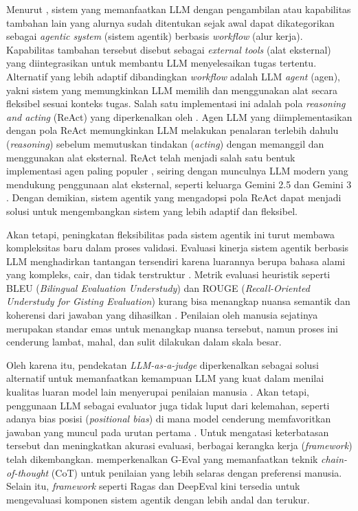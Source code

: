 Menurut \textcite{anthropicBuildingEffectiveAgents2024}, sistem yang memanfaatkan LLM dengan pengambilan atau kapabilitas tambahan lain yang alurnya sudah ditentukan sejak awal dapat dikategorikan sebagai \textit{agentic system} (sistem agentik) berbasis \textit{workflow} (alur kerja). Kapabilitas tambahan tersebut disebut sebagai \textit{external tools} (alat eksternal) yang diintegrasikan untuk membantu LLM menyelesaikan tugas tertentu. Alternatif yang lebih adaptif dibandingkan \textit{workflow} adalah LLM \textit{agent} (agen), yakni sistem yang memungkinkan LLM memilih dan menggunakan alat secara fleksibel sesuai konteks tugas. Salah satu implementasi ini adalah pola \textit{reasoning and acting} (ReAct) yang diperkenalkan oleh \textcite{yaoReActSynergizingReasoning2023}. Agen LLM yang diimplementasikan dengan pola ReAct memungkinkan LLM melakukan penalaran terlebih dahulu (\textit{reasoning}) sebelum memutuskan tindakan (\textit{acting}) dengan memanggil dan menggunakan alat eksternal. ReAct telah menjadi salah satu bentuk implementasi agen paling populer \parencite{yuSurveyAgentWorkflow2025}, seiring dengan munculnya LLM modern yang mendukung penggunaan alat eksternal, seperti keluarga Gemini 2.5 \parencite{comaniciGemini25Pushing2025} dan Gemini 3 \parencite{google2025}. Dengan demikian, sistem agentik yang mengadopsi pola ReAct dapat menjadi solusi untuk mengembangkan sistem yang lebih adaptif dan fleksibel.

Akan tetapi, peningkatan fleksibilitas pada sistem agentik ini turut membawa kompleksitas baru dalam proses validasi. Evaluasi kinerja sistem agentik berbasis LLM menghadirkan tantangan tersendiri karena luarannya berupa bahasa alami yang kompleks, cair, dan tidak terstruktur \parencite{liuGEvalNLGEvaluation2023}. Metrik evaluasi heuristik seperti BLEU (\textit{Bilingual Evaluation Understudy}) dan ROUGE (\textit{Recall-Oriented Understudy for Gisting Evaluation}) kurang bisa menangkap nuansa semantik dan koherensi dari jawaban yang dihasilkan \parencite{saiSurveyEvaluationMetrics2022}. Penilaian oleh manusia sejatinya merupakan standar emas untuk menangkap nuansa tersebut, namun proses ini cenderung lambat, mahal, dan sulit dilakukan dalam skala besar. 

Oleh karena itu, pendekatan \textit{LLM-as-a-judge} diperkenalkan sebagai solusi alternatif untuk memanfaatkan kemampuan LLM yang kuat dalam menilai kualitas luaran model lain menyerupai penilaian manusia \parencite{liGenerationJudgmentOpportunities2025}. Akan tetapi, penggunaan LLM sebagai evaluator juga tidak luput dari kelemahan, seperti adanya bias posisi (\textit{positional bias}) di mana model cenderung memfavoritkan jawaban yang muncul pada urutan pertama \parencite{wangLargeLanguageModels2024}. Untuk mengatasi keterbatasan tersebut dan meningkatkan akurasi evaluasi, berbagai kerangka kerja (\textit{framework}) telah dikembangkan. \textcite{liuGEvalNLGEvaluation2023} memperkenalkan G-Eval yang memanfaatkan teknik \textit{chain-of-thought} (CoT) untuk penilaian yang lebih selaras dengan preferensi manusia. Selain itu, \textit{framework} seperti Ragas \parencite{esRagasAutomatedEvaluation2025} dan DeepEval \parencite{confidentaiDeepEval2025} kini tersedia untuk mengevaluasi komponen sistem agentik dengan lebih andal dan terukur.


